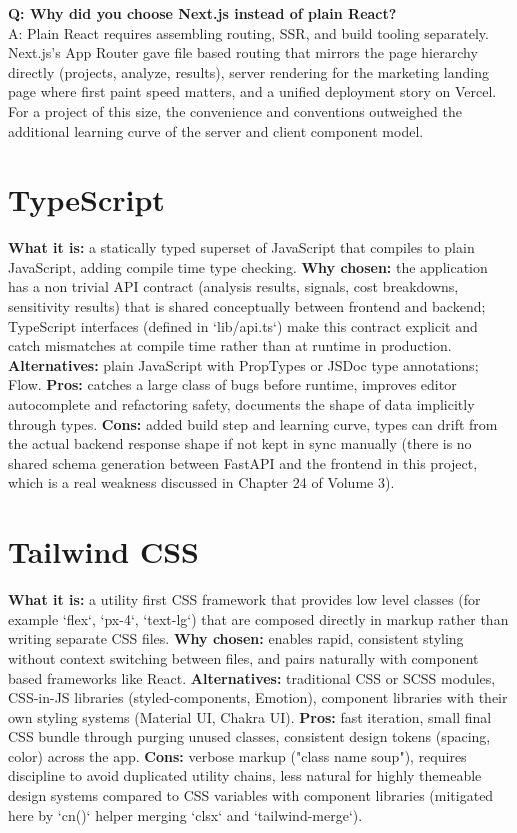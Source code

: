 \documentclass[11pt,a4paper]{report}
\begin{document}
\begin{qabox}
\textbf{Q: Why did you choose Next.js instead of plain React?} \\
A: Plain React requires assembling routing, SSR, and build tooling separately. Next.js's App Router gave file based routing that mirrors the page hierarchy directly (projects, analyze, results), server rendering for the marketing landing page where first paint speed matters, and a unified deployment story on Vercel. For a project of this size, the convenience and conventions outweighed the additional learning curve of the server and client component model.
\end{qabox}

\section{TypeScript}
\textbf{What it is:} a statically typed superset of JavaScript that compiles to plain JavaScript, adding compile time type checking.
\textbf{Why chosen:} the application has a non trivial API contract (analysis results, signals, cost breakdowns, sensitivity results) that is shared conceptually between frontend and backend; TypeScript interfaces (defined in `lib/api.ts`) make this contract explicit and catch mismatches at compile time rather than at runtime in production.
\textbf{Alternatives:} plain JavaScript with PropTypes or JSDoc type annotations; Flow.
\textbf{Pros:} catches a large class of bugs before runtime, improves editor autocomplete and refactoring safety, documents the shape of data implicitly through types.
\textbf{Cons:} added build step and learning curve, types can drift from the actual backend response shape if not kept in sync manually (there is no shared schema generation between FastAPI and the frontend in this project, which is a real weakness discussed in Chapter 24 of Volume 3).

\section{Tailwind CSS}
\textbf{What it is:} a utility first CSS framework that provides low level classes (for example `flex`, `px-4`, `text-lg`) that are composed directly in markup rather than writing separate CSS files.
\textbf{Why chosen:} enables rapid, consistent styling without context switching between files, and pairs naturally with component based frameworks like React.
\textbf{Alternatives:} traditional CSS or SCSS modules, CSS-in-JS libraries (styled-components, Emotion), component libraries with their own styling systems (Material UI, Chakra UI).
\textbf{Pros:} fast iteration, small final CSS bundle through purging unused classes, consistent design tokens (spacing, color) across the app.
\textbf{Cons:} verbose markup ("class name soup"), requires discipline to avoid duplicated utility chains, less natural for highly themeable design systems compared to CSS variables with component libraries (mitigated here by `cn()` helper merging `clsx` and `tailwind-merge`).
\end{document}
